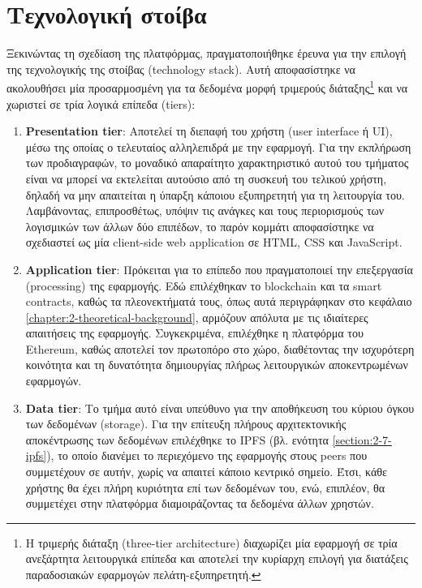 \section{Τεχνολογική στοίβα} \label{section:3-2-technology-stack}

Ξεκινώντας τη σχεδίαση της πλατφόρμας, πραγματοποιήθηκε έρευνα για την επιλογή της τεχνολογικής της στοίβας (technology stack). Αυτή αποφασίστηκε να ακολουθήσει μία προσαρμοσμένη για τα δεδομένα μορφή τριμερούς διάταξης\footnote{Η τριμερής διάταξη (three-tier architecture) διαχωρίζει μία εφαρμογή σε τρία ανεξάρτητα λειτουργικά επίπεδα και αποτελεί την κυρίαρχη επιλογή για διατάξεις παραδοσιακών εφαρμογών πελάτη-εξυπηρετητή.} και να χωριστεί σε τρία λογικά επίπεδα (tiers):

\begin{enumerate}
    \item \textbf{Presentation tier}: Αποτελεί τη διεπαφή του χρήστη (user interface ή UI), μέσω της οποίας ο τελευταίος αλληλεπιδρά με την εφαρμογή. Για την εκπλήρωση των προδιαγραφών, το μοναδικό απαραίτητο χαρακτηριστικό αυτού του τμήματος είναι να μπορεί να εκτελείται αυτούσιο από τη συσκευή του τελικού χρήστη, δηλαδή να μην απαιτείται η ύπαρξη κάποιου εξυπηρετητή για τη λειτουργία του. Λαμβάνοντας, επιπροσθέτως, υπόψιν τις ανάγκες και τους περιορισμούς των λογισμικών των άλλων δύο επιπέδων, το παρόν κομμάτι αποφασίστηκε να σχεδιαστεί ως μία client-side web application σε HTML, CSS και JavaScript.

    \item \textbf{Application tier}: Πρόκειται για το επίπεδο που πραγματοποιεί την επεξεργασία (\textenglish{processing}) της εφαρμογής. Εδώ επιλέχθηκαν το blockchain και τα smart contracts, καθώς τα πλεονεκτήματά τους, όπως αυτά περιγράφηκαν στο κεφάλαιο \ref{chapter:2-theoretical-background}, αρμόζουν απόλυτα με τις ιδιαίτερες απαιτήσεις της εφαρμογής. Συγκεκριμένα, επιλέχθηκε η πλατφόρμα του Ethereum, καθώς αποτελεί τον πρωτοπόρο στο χώρο, διαθέτοντας την ισχυρότερη κοινότητα και τη δυνατότητα δημιουργίας πλήρως λειτουργικών αποκεντρωμένων εφαρμογών.

    \item \textbf{Data tier}: Το τμήμα αυτό είναι υπεύθυνο για την αποθήκευση του κύριου όγκου των δεδομένων (storage). Για την επίτευξη πλήρους αρχιτεκτονικής αποκέντρωσης των δεδομένων επιλέχθηκε το IPFS (βλ. ενότητα \ref{section:2-7-ipfs}), το οποίο διανέμει το περιεχόμενο της εφαρμογής στους peers που συμμετέχουν σε αυτήν, χωρίς να απαιτεί κάποιο κεντρικό σημείο. Έτσι, κάθε χρήστης θα έχει πλήρη κυριότητα επί των δεδομένων του, ενώ, επιπλέον, θα συμμετέχει στην πλατφόρμα διαμοιράζοντας τα δεδομένα άλλων χρηστών.
\end{enumerate}


